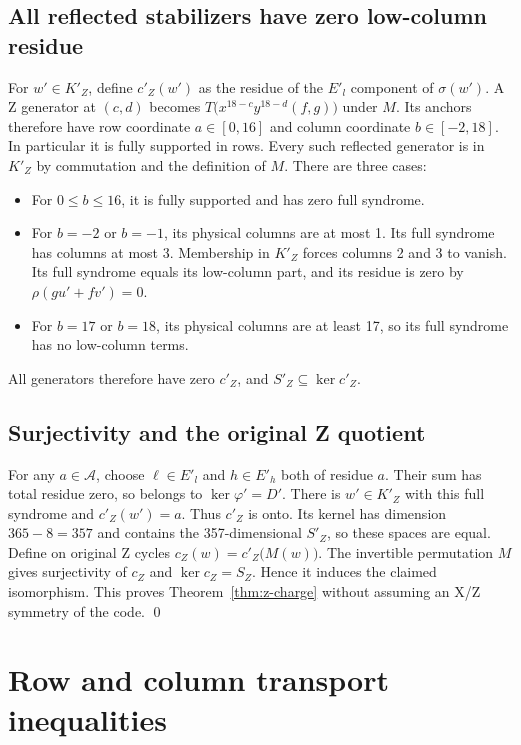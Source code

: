 \documentclass{article}
\begin{document}
\subsection{All reflected stabilizers have zero low-column residue}\label{sec:z-stabilizers}

For \(w' \in K'_Z\), define \(c'_Z(w')\) as the residue of the \(E'_l\) component of
\(\sigma(w')\). A Z generator at \((c,d)\) becomes \(T\bigl(x^{18-c} y^{18-d} (f, g)\bigr)\)
under \(M\). Its anchors therefore have row coordinate \(a \in [0,16]\) and column coordinate
\(b \in [-2,18]\). In particular it is fully supported in rows. Every such reflected
generator is in \(K'_Z\) by commutation and the definition of \(M\). There are three cases:
\begin{itemize}
  \item For \(0 \le b \le 16\), it is fully supported and has zero full syndrome.
  \item For \(b = -2\) or \(b = -1\), its physical columns are at most 1. Its full syndrome
    has columns at most 3. Membership in \(K'_Z\) forces columns 2 and 3 to vanish. Its full
    syndrome equals its low-column part, and its residue is zero by
    \(\rho(g u' + f v') = 0\).
  \item For \(b = 17\) or \(b = 18\), its physical columns are at least 17, so its full
    syndrome has no low-column terms.
\end{itemize}
All generators therefore have zero \(c'_Z\), and \(S'_Z \subseteq \ker c'_Z\).

\subsection{Surjectivity and the original Z quotient}\label{sec:z-quotient}

For any \(a \in \mathcal{A}\), choose \(\ell \in E'_l\) and \(h \in E'_h\) both of residue
\(a\). Their sum has total residue zero, so belongs to \(\ker \varphi' = D'\). There is
\(w' \in K'_Z\) with this full syndrome and \(c'_Z(w') = a\). Thus \(c'_Z\) is onto. Its
kernel has dimension \(365 - 8 = 357\) and contains the 357-dimensional \(S'_Z\), so these
spaces are equal. Define on original Z cycles \(c_Z(w) = c'_Z\bigl(M(w)\bigr)\). The
invertible permutation \(M\) gives surjectivity of \(c_Z\) and \(\ker c_Z = S_Z\). Hence it
induces the claimed isomorphism. This proves Theorem~\ref{thm:z-charge} without assuming an
X/Z symmetry of the code. \qed

\section{Row and column transport inequalities}\label{sec:transport}
\end{document}
